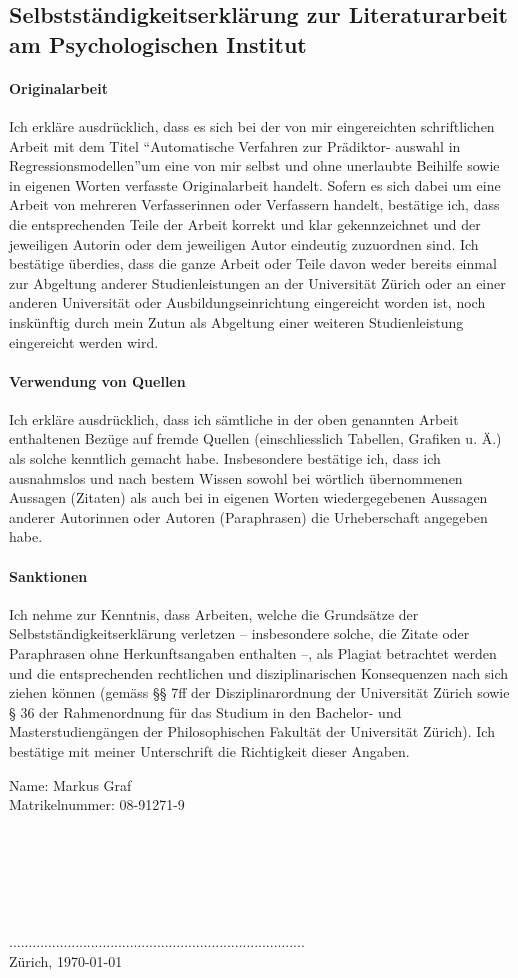 \documentclass[german,12pt,doc]{apa}
\begin{document}
\subsection*{Selbstständigkeitserklärung zur Literaturarbeit am  Psychologischen Institut}
\paragraph{Originalarbeit}
Ich erkläre ausdrücklich, dass es sich bei der von mir eingereichten schriftlichen Arbeit 
mit dem Titel ``Automatische Verfahren zur Prädiktor- auswahl in Regressionsmodellen''um eine von mir selbst und ohne unerlaubte Beihilfe sowie in eigenen Worten verfasste 
Originalarbeit handelt. 
Sofern es sich dabei um eine Arbeit von mehreren Verfasserinnen oder Verfassern handelt, bestätige ich, dass die entsprechenden Teile der Arbeit korrekt und klar gekennzeichnet und der jeweiligen Autorin oder dem jeweiligen Autor eindeutig zuzuordnen sind.
Ich bestätige überdies, dass die ganze Arbeit oder Teile davon weder bereits einmal zur Abgeltung anderer Studienleistungen an der Universität Zürich oder an einer anderen Universität oder Ausbildungseinrichtung eingereicht worden ist, noch inskünftig durch mein Zutun als Abgeltung einer weiteren Studienleistung eingereicht werden wird. 
 
\paragraph{Verwendung von Quellen} 
Ich erkläre ausdrücklich, dass ich sämtliche in der oben genannten Arbeit enthaltenen Bezüge auf fremde Quellen (einschliesslich Tabellen, Grafiken u. Ä.) als solche kenntlich gemacht habe. Insbesondere bestätige ich, dass ich ausnahmslos und nach bestem Wissen sowohl bei wörtlich übernommenen Aussagen (Zitaten) als auch bei in eigenen Worten wiedergegebenen Aussagen anderer Autorinnen oder Autoren (Paraphrasen) die Urheberschaft angegeben habe. 

\paragraph{Sanktionen}
Ich nehme zur Kenntnis, dass Arbeiten, welche die Grundsätze der 
Selbstständigkeitserklärung verletzen – insbesondere solche, die Zitate oder Paraphrasen ohne Herkunftsangaben enthalten –, als Plagiat betrachtet werden und die entsprechenden rechtlichen und disziplinarischen Konsequenzen nach sich ziehen können (gemäss §§ 7ff der Disziplinarordnung der Universität Zürich sowie § 36 der Rahmenordnung für das Studium in den Bachelor- und Masterstudiengängen der Philosophischen Fakultät der Universität Zürich). 
\newpage
Ich bestätige mit meiner Unterschrift die Richtigkeit dieser Angaben.

Name: Markus Graf\\
Matrikelnummer:  08-91271-9\\
\\
\\
\\
\\
\\
\\
............................................................................\\
Zürich, \today
\end{document}
